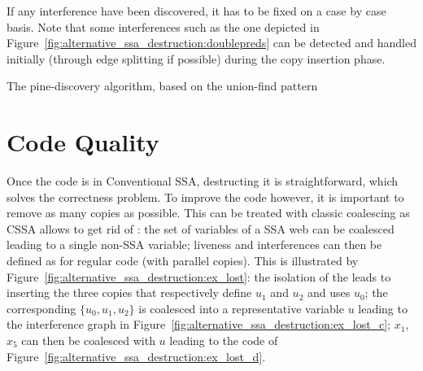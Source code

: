 If any interference have been discovered, it has to be fixed on a case by case basis. Note that some interferences such as the one depicted in Figure~\ref{fig:alternative_ssa_destruction:doublepreds} can be detected and handled initially (through edge splitting if possible) during the copy insertion phase.


\begin{algorithm}
\caption{\label{alg:alternative_ssadestruction_algorithm:find-webs}The pine-\phiwebs discovery algorithm, based on the union-find pattern}
\end{algorithm}

\section{Code Quality}
Once the code is in Conventional SSA, destructing it is straightforward, which solves the correctness problem. To improve the code however, it
is important to remove as many copies as possible. This can be treated
with classic coalescing as CSSA allows to get rid of \phifuns: the set of variables of a SSA web can be coalesced leading to a single non-SSA variable; liveness and
interferences can then be defined as for regular code (with parallel copies).
This is illustrated by Figure~\ref{fig:alternative_ssa_destruction:ex_lost}: the isolation of the \phifun leads to inserting the three copies that respectively define $u_1$ and $u_2$ and uses $u_0$; the corresponding \phiweb  $\{u_0, u_1, u_2\}$ is coalesced into a representative variable $u$ leading to the interference graph in Figure~\ref{fig:alternative_ssa_destruction:ex_lost_c}; $x_1$, $x_5$ can then be coalesced with $u$ leading to the code of Figure~\ref{fig:alternative_ssa_destruction:ex_lost_d}.

